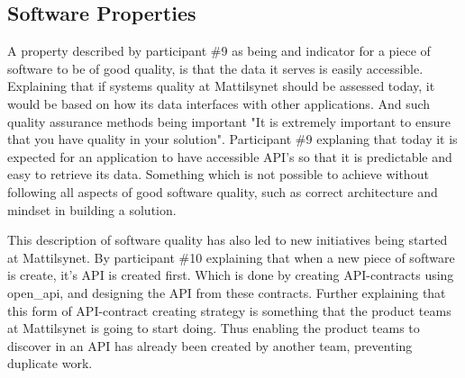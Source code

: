 \subsection{Software Properties}
A property described by participant \#9 as being and indicator for a piece of software to be of good quality, is that the data it serves is easily accessible. Explaining that if systems quality at Mattilsynet should be assessed today, it would be based on how its data interfaces with other applications. And such quality assurance methods being important "It is extremely important to ensure that you have quality in your solution". Participant \#9 explaning that today it is expected for an application to have accessible API's so that it is predictable and easy to retrieve its data. Something which is not possible to achieve without following all aspects of good software quality, such as correct architecture and mindset in building a solution. 


This description of software quality has also led to new initiatives being started at Mattilsynet. By participant \#10 explaining that when a new piece of software is create, it's API is created first. Which is done by creating API-contracts using \gls{open_api}, and designing the API from these contracts. Further explaining that this form of API-contract creating strategy is something that the product teams at Mattilsynet is going to start doing. Thus enabling the product teams to discover in an API has already been created by another team, preventing duplicate work.


